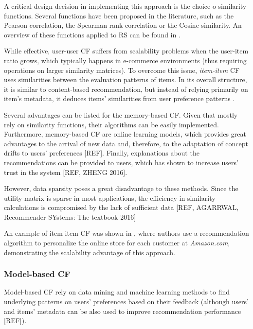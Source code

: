     A critical design decision in implementing this approach is the choice o similarity functions. 
    Several functions have been proposed in the literature, such as the Pearson correlation, the 
    Spearman rank correlation or the Cosine similarity. An overview of these functions applied to RS
    can be found in \cite{2011ekstrand}.
    
    While effective, user-user CF suffers from scalability problems when the user-item ratio grows, which typically happens in e-commerce environments (thus requiring operations on larger similarity matrices). To overcome this issue, \textit{item-item} CF uses similarities between the evaluation patterns of items. In its overall structure, it is similar to content-based recommendation, but instead of relying primarily on item's metadata, it deduces items' similarities from user preference patterns \cite{2001sarwar}.

    Several advantages can be listed for the memory-based CF. Given that mostly rely on similarity     functions, their algorithms can be easily implemented. Furthermore, memory-based CF are online     learning models, which provides great advantages to the arrival of new data and, therefore, to the adaptation of concept drifts to users' preferences [REF]. Finally, explanations about the     recommendations can be provided to users, which has shown to increase users' trust in the system     [REF, ZHENG 2016].

    However, data sparsity poses a great disadvantage to these methods. Since the utility matrix is 
    sparse in most applications, the efficiency in similarity calculations is compromised by the lack 
    of sufficient data [REF, AGARRWAL, Recommender SYstems: The textbook 2016]
    
    An example of item-item CF was shown in \cite{2003amazon}, where authors use a recommendation 
    algorithm to personalize the online store for each customer at \textit{Amazon.com}, demonstrating 
    the scalability advantage of this approach.

  \subsubsection{Model-based CF}

  Model-based CF rely on data mining and machine learning methods to find underlying patterns on 
  users' preferences based on their feedback (although users' and items' metadata can be also used to 
  improve recommendation performance [REF]). 

